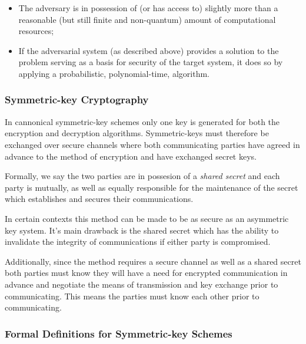\begin{itemize}
    \item The adversary is in possession of (or has access to) slightly more than a reasonable (but still finite and non-quantum) amount of computational resources;
    \item If the adversarial system (as described above) provides a solution to the problem serving as a basis for security of the target system, it does so by applying a probabilistic, polynomial-time, algorithm. 
\end{itemize}

\subsubsection{Symmetric-key Cryptography} 

In cannonical symmetric-key schemes only one key is generated for both the encryption and decryption algorithms. Symmetric-keys must therefore be exchanged over secure channels where both communicating parties have agreed in advance to the method of encryption and have exchanged secret keys. 


Formally, we say the two parties are in possesion of a \textit{shared secret} and each party is mutually, as well as equally responsible for the maintenance of the secret which establishes and secures their communications.

 In certain contexts this method can be made to be as secure as an asymmetric key system. It's main drawback is the shared secret which has the ability to invalidate the integrity of communications if either party is compromised.


Additionally, since the method requires a secure channel as well as a shared secret both parties must know they will have a need for encrypted communication in advance and negotiate the means of transmission and key exchange prior to communicating. This means the parties must know each other prior to communicating. 



\subsubsection*{Formal Definitions for Symmetric-key Schemes}


